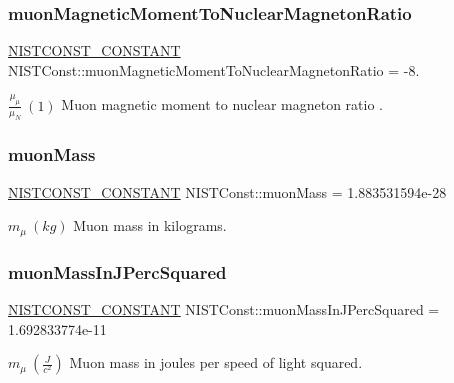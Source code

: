\subsubsection{\texorpdfstring{muon\+Magnetic\+Moment\+To\+Nuclear\+Magneton\+Ratio}{muonMagneticMomentToNuclearMagnetonRatio}}
{\footnotesize\ttfamily \mbox{\hyperlink{group___n_i_s_t_const-_macros_ga2b0fc1d7452373f816175dd86ce26729}{N\+I\+S\+T\+C\+O\+N\+S\+T\+\_\+\+C\+O\+N\+S\+T\+A\+NT}} N\+I\+S\+T\+Const\+::muon\+Magnetic\+Moment\+To\+Nuclear\+Magneton\+Ratio = -\/8.}

$\frac{\mu_\mu}{\mu_N} \ (1)$ Muon magnetic moment to nuclear magneton ratio . \mbox{\label{group___n_i_s_t_const-_muon_ga080664dd3b1c18f9956edb71386b5177}} 
\subsubsection{\texorpdfstring{muon\+Mass}{muonMass}}
{\footnotesize\ttfamily \mbox{\hyperlink{group___n_i_s_t_const-_macros_ga2b0fc1d7452373f816175dd86ce26729}{N\+I\+S\+T\+C\+O\+N\+S\+T\+\_\+\+C\+O\+N\+S\+T\+A\+NT}} N\+I\+S\+T\+Const\+::muon\+Mass = 1.\+883531594e-\/28}

$m_\mu \ (kg)$ Muon mass in kilograms. \mbox{\label{group___n_i_s_t_const-_muon_gad4d3ef88615f2e5317fd48617c0740ce}} 
\subsubsection{\texorpdfstring{muon\+Mass\+In\+J\+Perc\+Squared}{muonMassInJPercSquared}}
{\footnotesize\ttfamily \mbox{\hyperlink{group___n_i_s_t_const-_macros_ga2b0fc1d7452373f816175dd86ce26729}{N\+I\+S\+T\+C\+O\+N\+S\+T\+\_\+\+C\+O\+N\+S\+T\+A\+NT}} N\+I\+S\+T\+Const\+::muon\+Mass\+In\+J\+Perc\+Squared = 1.\+692833774e-\/11}

$m_\mu \ (\frac{J}{c^2})$ Muon mass in joules per speed of light squared. \mbox{\label{group___n_i_s_t_const-_muon_ga1931118dd705cad81b5defc9ecd5563b}} 
